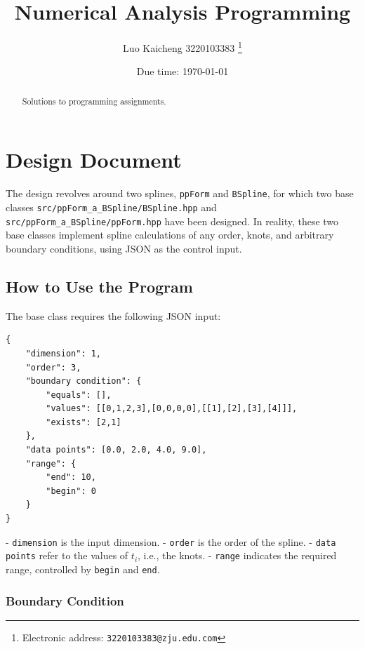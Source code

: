 \documentclass[a4paper]{article}
\begin{document}
\title{Numerical Analysis Programming}

\author{Luo Kaicheng 3220103383
  \thanks{Electronic address: \texttt{3220103383@zju.edu.com}}}

\date{Due time: \today}

\maketitle

\begin{abstract}
    Solutions to programming assignments.
\end{abstract}

\section*{Design Document}
The design revolves around two splines, \texttt{ppForm} and \texttt{BSpline}, for which two base classes \texttt{src/ppForm\_a\_BSpline/BSpline.hpp} and \texttt{src/ppForm\_a\_BSpline/ppForm.hpp} have been designed. In reality, these two base classes implement spline calculations of any order, knots, and arbitrary boundary conditions, using JSON as the control input.

\subsection*{How to Use the Program}

The base class requires the following JSON input:

\begin{verbatim}
{
    "dimension": 1,
    "order": 3,
    "boundary condition": {
        "equals": [],
        "values": [[0,1,2,3],[0,0,0,0],[[1],[2],[3],[4]]],
        "exists": [2,1]
    },
    "data points": [0.0, 2.0, 4.0, 9.0],
    "range": {
        "end": 10,
        "begin": 0
    }
}
\end{verbatim}

- \texttt{dimension} is the input dimension.
- \texttt{order} is the order of the spline.
- \texttt{data points} refer to the values of $t_i$, i.e., the knots.
- \texttt{range} indicates the required range, controlled by \texttt{begin} and \texttt{end}.

\subsubsection*{Boundary Condition}
\end{document}
